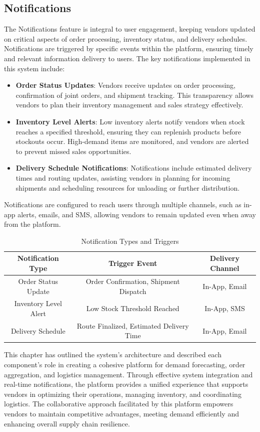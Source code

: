 \subsection{Notifications}

The Notifications feature is integral to user engagement, keeping vendors updated on critical aspects of order processing, inventory status, and delivery schedules. Notifications are triggered by specific events within the platform, ensuring timely and relevant information delivery to users. The key notifications implemented in this system include:

\begin{itemize}
    \item \textbf{Order Status Updates}: Vendors receive updates on order processing, confirmation of joint orders, and shipment tracking. This transparency allows vendors to plan their inventory management and sales strategy effectively.
    \item \textbf{Inventory Level Alerts}: Low inventory alerts notify vendors when stock reaches a specified threshold, ensuring they can replenish products before stockouts occur. High-demand items are monitored, and vendors are alerted to prevent missed sales opportunities.
    \item \textbf{Delivery Schedule Notifications}: Notifications include estimated delivery times and routing updates, assisting vendors in planning for incoming shipments and scheduling resources for unloading or further distribution.
\end{itemize}

Notifications are configured to reach users through multiple channels, such as in-app alerts, emails, and SMS, allowing vendors to remain updated even when away from the platform.

\begin{table}[H]
\centering
\caption{Notification Types and Triggers}
\begin{tabular}{|c|c|c|}
\hline
\textbf{Notification Type} & \textbf{Trigger Event} & \textbf{Delivery Channel} \\ \hline
Order Status Update & Order Confirmation, Shipment Dispatch & In-App, Email \\ \hline
Inventory Level Alert & Low Stock Threshold Reached & In-App, SMS \\ \hline
Delivery Schedule & Route Finalized, Estimated Delivery Time & In-App, Email \\ \hline
\end{tabular}
\end{table}


This chapter has outlined the system's architecture and described each component's role in creating a cohesive platform for demand forecasting, order aggregation, and logistics management. Through effective system integration and real-time notifications, the platform provides a unified experience that supports vendors in optimizing their operations, managing inventory, and coordinating logistics. The collaborative approach facilitated by this platform empowers vendors to maintain competitive advantages, meeting demand efficiently and enhancing overall supply chain resilience.
